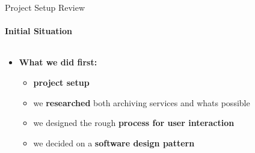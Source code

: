 \documentclass[
ngerman,%
authorontitle=true,
]{bfhbeamer}
\begin{document}
	\begin{frame}{Project Setup Review}
		\framesubtitle{Initial Situation}
		\begin{columns} %
			\begin{column}{0.7\textwidth} %
				\begin{itemize}
					\item \textbf{What we did first:}
					\begin{itemize}
						\item \textbf{project setup}
						\item we \textbf{researched} both archiving services and whats possible
						\item we designed the rough \textbf{process for user interaction}
						\item we decided on a \textbf{software design pattern}
					\end{itemize}
					\bigskip
					\bigskip
					\bigskip
				\end{itemize}
			\end{column}
			\begin{column}{0.23\textwidth} %
				\begin{center}

\end{center}
\end{column}
\end{columns}
\end{frame}
\end{document}
